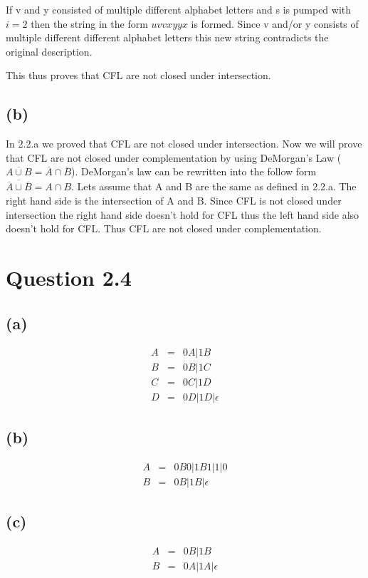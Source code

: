 \documentclass[a4paper, 10pt]{article}
\begin{document}
 If v and y consisted of multiple different alphabet letters and s is pumped with $i = 2$ then the string in the form $uvvxyyx$ is formed. Since v and/or y consists of multiple different different alphabet letters this new string contradicts the original description.

This thus proves that CFL are not closed under intersection.
\subsection*{(b)}
In 2.2.a we proved that CFL are not closed under intersection.
Now we will prove that CFL are not closed under complementation by using DeMorgan's Law ($\overline{A\cup B} = \overline{A}\cap \overline{B}$). DeMorgan's law can be rewritten into the follow form $\overline{\overline{A}\cup \overline{B}} = A\cap B$. Lets assume that A and B are the same as defined in 2.2.a. The right hand side is the intersection of A and B. Since CFL is not closed under intersection the right hand side doesn't hold for 
CFL thus the left hand side also doesn't hold for CFL. Thus CFL are not closed under complementation.
\section*{Question 2.4}
\subsection*{(a)}
\begin{eqnarray}
A &=& 0A|1B\nonumber\\
B &=& 0B|1C\nonumber\\
C &=& 0C|1D\nonumber\\
D &=& 0D|1D|\epsilon\nonumber
\end{eqnarray}
\subsection*{(b)}
\begin{eqnarray}
A &=& 0B0|1B1|1|0\nonumber\\
B &=& 0B|1B|\epsilon\nonumber
\end{eqnarray}
\subsection*{(c)}
\begin{eqnarray}
A &=& 0B|1B\nonumber\\
B &=& 0A|1A|\epsilon\nonumber
\end{eqnarray}
\end{document}

